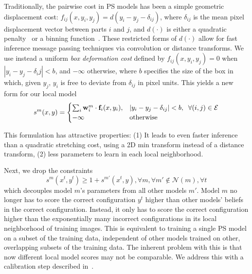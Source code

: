 \label{sec:boxdist}
Traditionally, the pairwise cost in PS models has been a simple geometric 
displacement cost: $f_{ij}(x,y_i,y_j) = d(y_i - y_j - \delta_{ij})$, where 
$\delta_{ij}$ is the mean pixel displacement vector between parts $i$ and $j$, 
and $d(\cdot)$ is either a quadratic penalty~\citep{felz05} or a binning 
function~\citep{devacrf}.  These restricted forms of $d(\cdot)$ allow for fast 
inference message passing techniques via convolution or distance transforms.  
We use instead a uniform {\em box deformation cost} defined by 
$f_{ij}(x,y_i,y_j) = 0$ when $|y_i - y_j - \delta_ij| < b$, and $-\infty$ 
otherwise, where $b$ specifies the size of the box in which, given $y_j$, $y_i$ 
is free to deviate from $\delta_{ij}$ in pixel units.  This yields a new form 
for our local model \begin{align}\label{eq:boxdist}
s^m(x,y) = 
\begin{cases}
 \sum_i \mathbf{w}^m_i \cdot \mathbf{f}_i(x,y_i), & |y_i - y_j - \delta_{ij}| < b,\;\; \forall 
(i,j) \in \mathcal{E} \\
 -\infty & \text{otherwise}
 \end{cases}
\end{align}

This formulation has attractive properties: (1) It leads to even faster inference than a quadratic stretching cost, using a 2D min transform instead of a distance transform, (2) less parameters to learn in each local neighborhood.

 Next, we drop the constraints
$$s^m(x^t,y^t) \geq 1 + s^{m'}(x^t,y), \forall m, \forall m'\notin 
\mathcal{N}(m),\forall t$$ which decouples model $m$'s parameters from all 
other models $m'$.  Model $m$ no longer has to score the correct configuration 
$y^t$ higher than other models' beliefs in the correct configuration.  Instead, 
it only has to score the correct configuration higher than the exponentially 
many incorrect configurations in its local neighborhood of training images.  
This is equivalent to training a single PS model on a subset of the training 
data, independent of other models trained on other, overlapping subsets of the 
training data.  The inherent problem with this is that now different local 
model scores may not be comparable.  We address this with a calibration step 
described in~.

